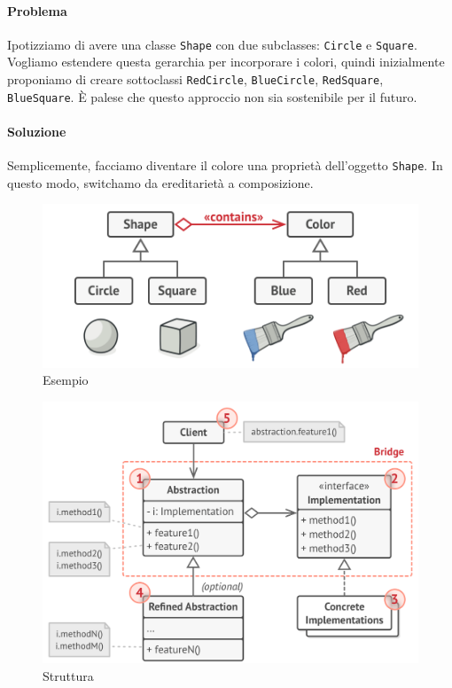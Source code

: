 \documentclass[11pt]{article}
\newcommand{\code}[1]{\texttt{#1}}
\begin{document}
\paragraph{Problema}
Ipotizziamo di avere una classe \code{Shape} con due subclasses: \code{Circle} e \code{Square}. Vogliamo estendere questa gerarchia per incorporare i colori, quindi inizialmente proponiamo di creare sottoclassi \code{RedCircle}, \code{BlueCircle}, \code{RedSquare}, \code{BlueSquare}. È palese che questo approccio non sia sostenibile per il futuro. 
\paragraph{Soluzione}
Semplicemente, facciamo diventare il colore una proprietà dell'oggetto \code{Shape}. In questo modo, switchamo da ereditarietà a composizione. 
\begin{figure}[H]
    \centering
    \includegraphics[width=\linewidth]{res/teoria/Bridge.png}
    \caption{Esempio}
\end{figure}
\begin{figure}[H]
    \centering
    \includegraphics[width=\linewidth]{res/teoria/BridgeStructure.png}
    \caption{Struttura}
\end{figure}
\end{document}

